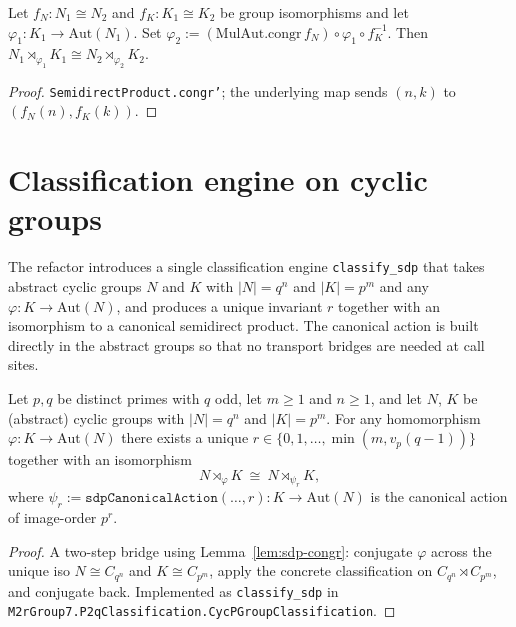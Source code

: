 \begin{lemma}
    \label{lem:sdp-congr}
    Let $f_N : N_1 \cong N_2$ and $f_K : K_1 \cong K_2$ be group isomorphisms
    and let $\varphi_1 : K_1 \to \mathrm{Aut}(N_1)$. Set
    $\varphi_2 := (\mathrm{MulAut.congr}\,f_N) \circ \varphi_1 \circ f_K^{-1}$.
    Then $N_1 \rtimes_{\varphi_1} K_1 \cong N_2 \rtimes_{\varphi_2} K_2$.
\end{lemma}
\begin{proof}
    \texttt{SemidirectProduct.congr'}; the underlying map sends
    $(n, k)$ to $(f_N(n), f_K(k))$.
\end{proof}

\section{Classification engine on cyclic groups}

The refactor introduces a single classification engine
\texttt{classify\_sdp} that takes abstract cyclic groups $N$ and $K$ with
$|N| = q^n$ and $|K| = p^m$ and any $\varphi : K \to \mathrm{Aut}(N)$, and
produces a unique invariant $r$ together with an isomorphism to a canonical
semidirect product. The canonical action is built directly in the abstract
groups so that no transport bridges are needed at call sites.

\begin{theorem}
    \label{thm:classify-sdp}
    Let $p, q$ be distinct primes with $q$ odd, let $m \geq 1$ and $n \geq 1$,
    and let $N$, $K$ be (abstract) cyclic groups with $|N| = q^n$ and
    $|K| = p^m$. For any homomorphism $\varphi : K \to \mathrm{Aut}(N)$ there
    exists a unique $r \in \{0, 1, \dots, \min(m, v_p(q-1))\}$ together with an
    isomorphism
    \[
        N \rtimes_\varphi K \ \cong\ N \rtimes_{\psi_r} K,
    \]
    where $\psi_r := \mathtt{sdpCanonicalAction}(\dots, r) : K \to
    \mathrm{Aut}(N)$ is the canonical action of image-order $p^r$.
\end{theorem}
\begin{proof}
    A two-step bridge using Lemma~\ref{lem:sdp-congr}: conjugate $\varphi$
    across the unique iso $N \cong C_{q^n}$ and $K \cong C_{p^m}$, apply the
    concrete classification on $C_{q^n} \rtimes C_{p^m}$, and conjugate back.
    Implemented as \texttt{classify\_sdp} in
    \texttt{M2rGroup7.P2qClassification.CycPGroupClassification}.
\end{proof}

